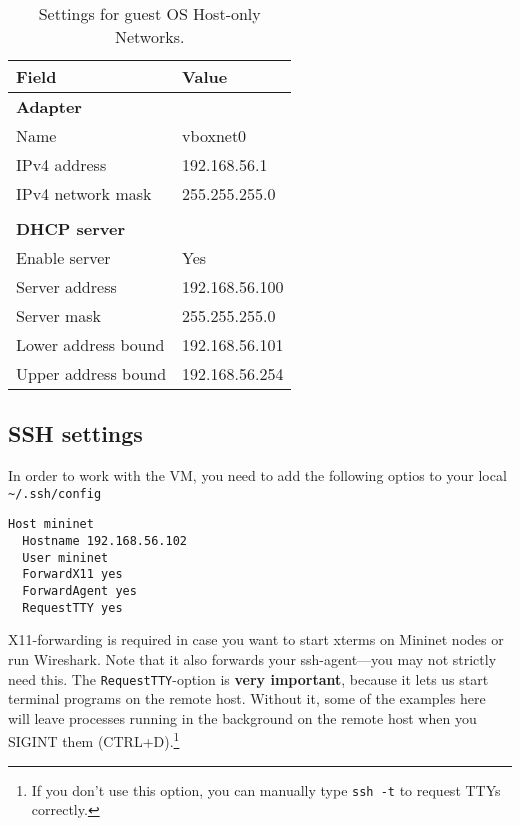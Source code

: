 \begin{table}[H]
  \centering
  \begin{tabular}{ll}
    \hline \textbf{Field} & \textbf{Value} \\
    \hline
      \textbf{Adapter} & \\
      Name & vboxnet0 \\
      IPv4 address & 192.168.56.1 \\
      IPv4 network mask & 255.255.255.0 \\
       & \\
      \textbf{DHCP server} & \\
      Enable server & Yes \\
      Server address & 192.168.56.100 \\
      Server mask & 255.255.255.0 \\
      Lower address bound & 192.168.56.101 \\
      Upper address bound & 192.168.56.254 \\
    \hline
  \end{tabular}
  \caption{Settings for guest OS Host-only Networks.}
  \label{table:hostonlynetworks.settings}
\end{table}

\subsection{SSH settings}
\label{chapter:ssh.setup}

In order to work with the VM, you need to add the following optios to your
local \texttt{\~{}/.ssh/config}

\begin{verbatim}
Host mininet
  Hostname 192.168.56.102
  User mininet
  ForwardX11 yes
  ForwardAgent yes
  RequestTTY yes
\end{verbatim}

X11-forwarding is required in case you
want to start xterms on Mininet
nodes or run Wireshark.  Note that it also forwards your
ssh-agent---you may not strictly need this.  The \texttt{RequestTTY}-option
is \textbf{very important}, because it lets us start terminal programs on the remote
host. Without it, some of the examples here will leave processes running in
the background on the remote host when you SIGINT them (CTRL+D).\footnote{If
you don't use this option, you can manually type \texttt{ssh -t} to request
TTYs correctly.}

